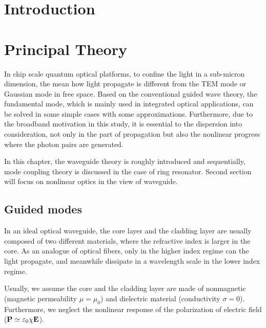 \documentclass[final]{kuee_en}
\title{\cjk{窒化シリコン\\リング共振器を用いた\\広帯域周波数もつれ光子生成}}
\author{\cjk{殷　政浩}}
\date{\cjk{令和2年2月1日}}
\begin{document}
\maketitle

\begin{abstract}
    \lipsum[1]
\end{abstract}

\chapter{Introduction}
\lipsum[2-3]
\chapter{Principal Theory}

In chip scale quantum optical platforms, to confine the light in a sub-micron dimension, the mean how light propagate is different from the TEM mode or Gaussian mode in free space. Based on the conventional guided wave theory, the fundamental mode, which is mainly used in integrated optical applications, can be solved in some simple cases with some approximations. Furthermore, due to the broadband motivation in this study, it is essential to the dispersion into consideration, not only in the part of propagation but also the nonlinear progress where the photon pairs are generated.

In this chapter, the waveguide theory is roughly introduced and sequentially, mode coupling theory is discussed in the case of ring resonator. Second section will focus on nonlinear optics in the view of waveguide.

\section{Guided modes}

In an ideal optical waveguide, the core layer and the cladding layer are usually composed of two different materials, where the refractive index is larger in the core. As an analogue of optical fibers, only in the higher index regime can the light propagate, and meanwhile dissipate in a wavelength scale in the lower index regime.

Usually, we assume the core and the cladding layer are made of nonmagnetic (magnetic permeability $\mu = \mu_0$) and dielectric material (conductivity $\sigma = 0$). Furthermore, we neglect the nonlinear response of the polarization of electric field ($\vb{P} \simeq \varepsilon_0 \chi \vb{E}$).
\end{document}
